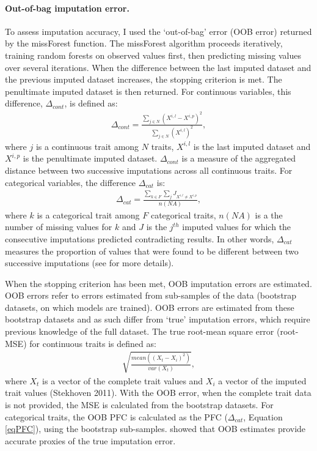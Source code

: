 \paragraph{Out-of-bag imputation error.}
To assess imputation accuracy, I used the `out-of-bag' error (OOB error) returned by the missForest function. The missForest algorithm proceeds iteratively, training random forests on observed values first, then predicting missing values over several iterations. When the difference between the last imputed dataset and the previous imputed dataset increases, the stopping criterion is met. The penultimate imputed dataset is then returned. For continuous variables, this difference, $\Delta_{cont}$,  is defined as:
\begin{align}
\Delta_{cont}=\frac{\sum_{j \in N}\left(X^{i,l}-X^{i,p}\right)^2}{\sum_{j \in N}\left(X^{i,l}\right)^2}, 
\end{align}
where $j$ is a continuous trait among $N$ traits, $X^{i,l}$ is the last imputed dataset and $X^{i,p}$ is the penultimate imputed dataset.  $\Delta_{cont}$ is a measure of the aggregated distance between two successive imputations across all continuous traits.  For categorical variables, the difference $\Delta_{cat}$ is:
\begin{align}
\Delta_{cat}=\frac{\sum_{k \in F}\sum_{j} J_{X^{i,l}\neq X^{i,p}}}{n(NA)}, 
\label{eqPFC}
\end{align}
where $k$ is a categorical trait among $F$ categorical traits, $n(NA)$ is a the number of missing values for $k$ and $J$ is the $j^{th}$ imputed values for which the consecutive imputations predicted contradicting results. In other words, $\Delta_{cat}$ measures the proportion of values that were found to be different between two successive imputations
(see \cite{Stekhoven2012} for more details).

When the stopping criterion has been met, OOB imputation errors are estimated.
OOB errors refer to errors estimated from sub-samples of the data (bootstrap datasets, on which models are trained). OOB errors are estimated from these bootstrap datasets and as such differ from `true' imputation errors, which require previous knowledge of the full dataset. The true root-mean square error (root-MSE) for continuous traits is defined as: 
\begin{align}
\sqrt{\frac{mean\left(\left(X_t-X_i\right)^2\right)}{var\left(X_t\right)}}, 
\end{align}
where $X_t$ is a vector of the complete trait values and $X_i$ a vector of the imputed trait values (Stekhoven 2011). With the OOB error, when the complete trait data is not provided, the MSE is calculated from the bootstrap datasets. For categorical traits, the OOB PFC is calculated as the PFC ($\Delta_{cat}$, Equation \ref{eqPFC}), using the bootstrap sub-samples. \cite{Breiman2001} showed that OOB estimates provide accurate proxies of the true imputation error. 

